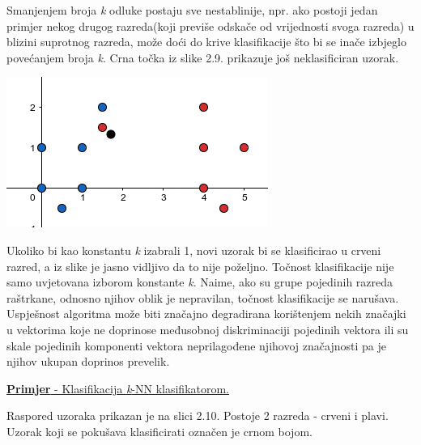 \documentclass[times, utf8, zavrsni]{fer}
\begin{document}
\begin{multicols}{2}

Smanjenjem broja \textit{k} odluke postaju
sve nestablinije, npr. ako postoji jedan primjer nekog drugog 
razreda(koji previše odskače od vrijednosti svoga razreda) u blizini suprotnog razreda, 
može doći do krive klasifikacije što bi se inače izbjeglo povećanjem broja \textit{k}. 
Crna točka iz slike 2.9. prikazuje još neklasificiran uzorak. 

\begin{minipage}{\linewidth}
\vspace{10pt}
\centering
\includegraphics[width=0.8\linewidth]{img/krivo.png}
\end{minipage}

\end{multicols}

\bigbreak
Ukoliko bi kao konstantu \textit{k} izabrali 1, novi uzorak bi se klasificirao 
u crveni razred, a iz slike je jasno vidljivo da to nije poželjno. Točnost 
klasifikacije nije samo uvjetovana izborom konstante \textit{k}. Naime, 
ako su grupe pojedinih razreda raštrkane, odnosno njihov oblik je nepravilan,
točnost klasifikacije se narušava. Uspješnost algoritma može biti 
značajno degradirana korištenjem nekih značajki u vektorima koje ne 
doprinose međusobnoj diskriminaciji pojedinih vektora ili su skale pojedinih 
komponenti vektora neprilagođene njihovoj značajnosti pa je njihov ukupan doprinos prevelik. 

\bigbreak

\underline{\textbf{Primjer} -  Klasifikacija \textit{k}-NN klasifikatorom. }

\bigbreak

Raspored uzoraka prikazan je na slici 2.10. Postoje 2 razreda - crveni i plavi. 
Uzorak koji se pokušava klasificirati označen je crnom bojom. 
\end{document}

